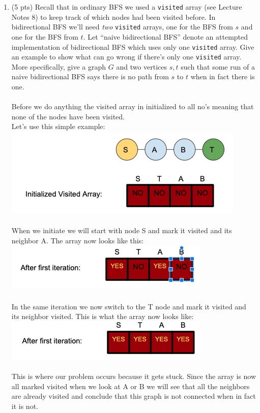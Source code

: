 \documentclass[12pt]{article}
\begin{document}
\begin{enumerate}
\begin{enumerate}
	\pagebreak
	
	\item \label{1b} (5 pts) Recall that in ordinary BFS we used a \texttt{visited} array (see Lecture Notes 8) to keep track of which nodes had been visited before. In bidirectional BFS we'll need \emph{two} \texttt{visited} arrays, one for the BFS from $s$ and one for the BFS from $t$. Let ``naive bidirectional BFS'' denote an attempted implementation of bidirectional BFS which uses only one {\tt visited} array.  Give an example to show what can go wrong if there's only one \texttt{visited} array. More specifically, give a graph $G$ and two vertices $s,t$ such that some run of a naive bidirectional BFS says there is no path from $s$ to $t$ when in fact there is one.
	\\
	\\
	Before we do anything the visited array in initialized to all no's meaning that none of the nodes have been visited.
	\\
	Let's use this simple example:
	\\
	\includegraphics[scale=0.6]{problem1bpic1.png}
	\\
	\\
	When we initiate we will start with node S and mark it visited and its neighbor A. The array now looks like this:
	\\
	\includegraphics[scale=0.6]{problem1bpic2.png}
	\\
	\\
	In the same iteration we now switch to the T node and mark it visited and its neighbor visited. This is what the array now looks like:
	\\
	\includegraphics[scale=0.6]{problem1bpic3.png}
	\\
	\\
	This is where our problem occurs because it gets stuck. Since the array is now all marked visited when we look at A or B we will see that all the neighbors are already visited and conclude that this graph is not connected when in fact it is not.
	\pagebreak
	

\end{enumerate}
\end{enumerate}
\end{document}
